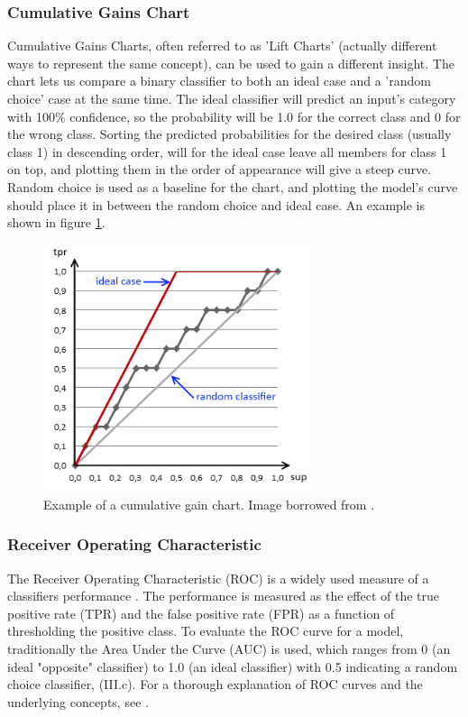 \subsubsection{Cumulative Gains Chart}
Cumulative Gains Charts, often referred to as 'Lift Charts' (actually different
ways to represent the same concept), can be used to gain a different insight.
The chart lets us compare a binary classifier to both an ideal case and a
'random choice' case at the same time. The ideal classifier will predict an
input's category with 100\% confidence, so the probability will be 1.0 for
the correct class and 0 for the wrong class. Sorting the predicted
probabilities for the desired class (usually class 1) in descending order,
will for the ideal case leave all members for class 1 on top, and plotting
them in the order of appearance will give a steep curve. Random choice is
used as a baseline for the chart, and plotting the model's curve should
place it in between the random choice and ideal case. An example is shown in
figure \ref{fig:cumul-example}.
\begin{figure}[h]
    \includegraphics[width=0.7\textwidth]{figures/gain-chart}
    \caption{Example of a cumulative gain chart. Image borrowed from
    \cite{gains-example-image}.}
    \label{fig:cumul-example}
\end{figure}

\subsubsection{Receiver Operating Characteristic}
The Receiver Operating Characteristic (ROC) is a widely used measure of a 
classifiers performance . The performance is measured as the effect
of the true positive rate (TPR) and the false positive rate (FPR) as a function 
of thresholding the positive class. To evaluate the ROC curve for a model, 
traditionally the Area Under the Curve (AUC) is used, which ranges from 0 
(an ideal "opposite" classifier) to 1.0 (an ideal classifier) with 0.5 
indicating a random choice classifier, \cite{bertbert-article}(III.c).
For a thorough explanation of ROC curves and the underlying concepts, see \cite{roc-article}.

